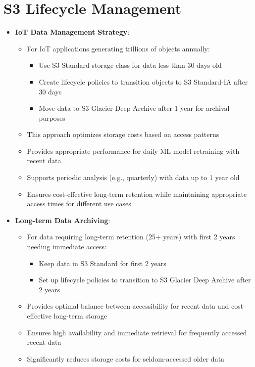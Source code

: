 \documentclass[11pt,a4paper]{report}
\begin{document}
\section{S3 Lifecycle Management}

\begin{itemize}
  \item \textbf{IoT Data Management Strategy}:
\begin{itemize}
  \item For IoT applications generating trillions of objects annually:
\begin{itemize}
  \item Use S3 Standard storage class for data less than 30 days old
  \item Create lifecycle policies to transition objects to S3 Standard-IA after 30 days
  \item Move data to S3 Glacier Deep Archive after 1 year for archival purposes
\end{itemize}
  \item This approach optimizes storage costs based on access patterns
  \item Provides appropriate performance for daily ML model retraining with recent data
  \item Supports periodic analysis (e.g., quarterly) with data up to 1 year old
  \item Ensures cost-effective long-term retention while maintaining appropriate access times for different use cases
\end{itemize}
  \item \textbf{Long-term Data Archiving}:
\begin{itemize}
  \item For data requiring long-term retention (25+ years) with first 2 years needing immediate access:
\begin{itemize}
  \item Keep data in S3 Standard for first 2 years
  \item Set up lifecycle policies to transition to S3 Glacier Deep Archive after 2 years
\end{itemize}
  \item Provides optimal balance between accessibility for recent data and cost-effective long-term storage
  \item Ensures high availability and immediate retrieval for frequently accessed recent data
  \item Significantly reduces storage costs for seldom-accessed older data
\end{itemize}

\end{itemize}
\end{document}
